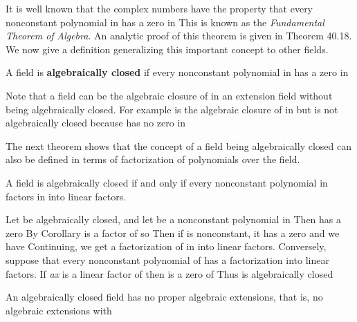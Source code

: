 \documentclass[11pt,oneside]{article}
\begin{document}
\begin{BookBody}
It is well known that the complex numbers have the property that every nonconstant polynomial in  has a zero in  This is known as the\textit{ Fundamental Theorem of} \textit{Algebra}. An analytic proof of this theorem is given in Theorem 40.18. We now give a definition generalizing this important concept to other fields.

 A field  is\textbf{ algebraically closed} if every nonconstant polynomial in  has a zero in \BookEnd{\blacksquare}

Note that a field  can be the algebraic closure of  in an extension field  without  being algebraically closed. For example is the algebraic closure of  in  but  is not algebraically closed because  has no zero in 

The next theorem shows that the concept of a field being algebraically closed can also be defined in terms of factorization of polynomials over the field.

 A field  is algebraically closed if and only if every nonconstant polynomial in  factors in  into linear factors.

 Let  be algebraically closed, and let  be a nonconstant polynomial in  Then  has a zero  By Corollary  is a factor of  so   Then if  is nonconstant, it has a zero  and we have   Continuing, we get a factorization of  in  into linear factors. Conversely, suppose that every nonconstant polynomial of  has a factorization into linear factors. If\textit{ ax}  is a linear factor of  then  is a zero of  Thus  is algebraically closed\BookEnd{\blacklozenge}

 An algebraically closed field  has no proper algebraic extensions, that is, no algebraic extensions  with 


\end{BookBody}
\end{document}
